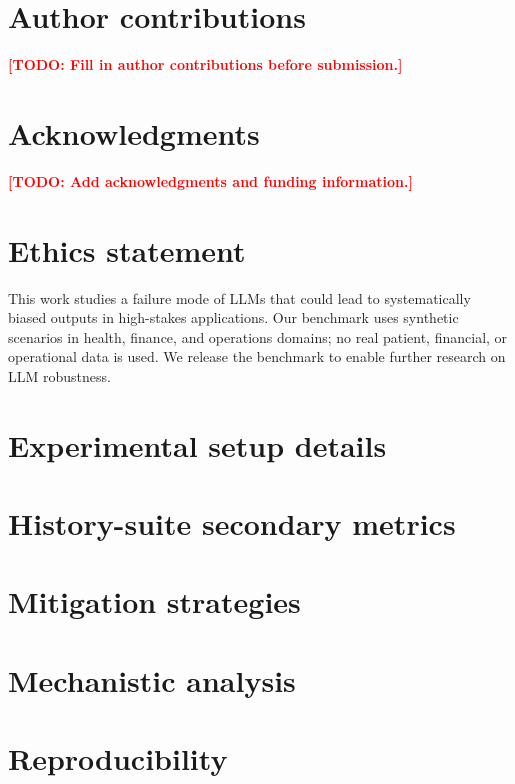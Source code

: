 \documentclass{article} %
\newcommand{\todo}[1]{\textcolor{red}{\textbf{[TODO: #1]}}}
\begin{document}
\section*{Author contributions}
\todo{Fill in author contributions before submission.}

\section*{Acknowledgments}
\todo{Add acknowledgments and funding information.}

\section*{Ethics statement}
This work studies a failure mode of LLMs that could lead to
systematically biased outputs in high-stakes applications.
Our benchmark uses synthetic scenarios in health, finance,
and operations domains; no real patient, financial, or
operational data is used.  We release the benchmark to enable
further research on LLM robustness.




\appendix

\section{Experimental setup details}
\label{app:setup}


\section{History-suite secondary metrics}
\label{app:history-secondary}


\section{Mitigation strategies}
\label{app:mitigations}


\section{Mechanistic analysis}
\label{app:mechanistic}


\section{Reproducibility}
\label{app:repro}

\end{document}
